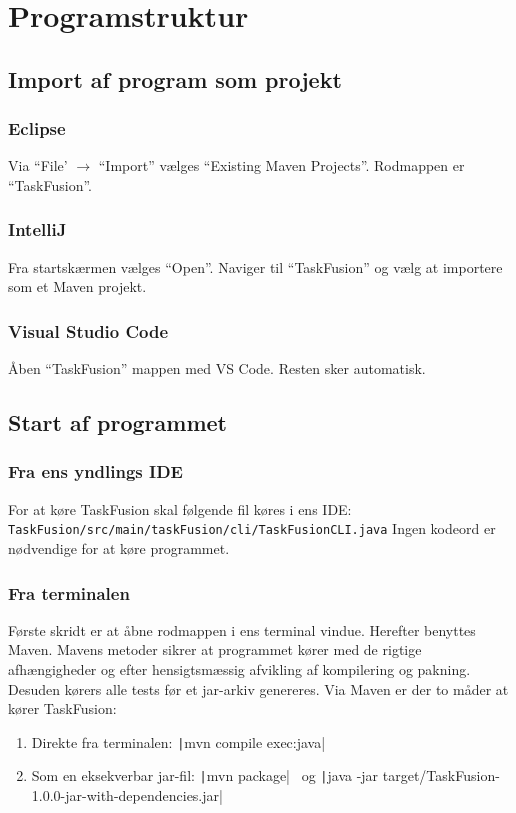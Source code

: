 \section{Programstruktur}\label{sec:struct}
\subsection{Import af program som projekt}
\subsubsection{Eclipse}
Via ``File' \(\rightarrow\) ``Import'' vælges ``Existing Maven Projects''. Rodmappen er ``TaskFusion''.
\subsubsection{IntelliJ}
Fra startskærmen vælges ``Open''. Naviger til ``TaskFusion'' og vælg at importere som et Maven projekt.
\subsubsection{Visual Studio Code}
Åben ``TaskFusion'' mappen med VS Code. Resten sker automatisk.
\subsection{Start af programmet}
\subsubsection{Fra ens yndlings IDE}
For at køre TaskFusion skal følgende fil køres i ens IDE:\newline
\texttt{TaskFusion/src/main/taskFusion/cli/TaskFusionCLI.java}\newline
Ingen kodeord er nødvendige for at køre programmet.
\subsubsection{Fra terminalen}
Første skridt er at åbne rodmappen i ens terminal vindue. Herefter benyttes Maven. Mavens metoder sikrer at programmet kører med de rigtige afhængigheder og efter hensigtsmæssig afvikling af kompilering og pakning. Desuden kørers alle tests før et jar-arkiv genereres. Via Maven er der to måder at kører TaskFusion:
\begin{enumerate}
    \item Direkte fra terminalen: \texttt|mvn compile exec:java|
    \item Som en eksekverbar jar-fil: \texttt|mvn package| \ og \newline \texttt|java -jar target/TaskFusion-1.0.0-jar-with-dependencies.jar|
\end{enumerate}

